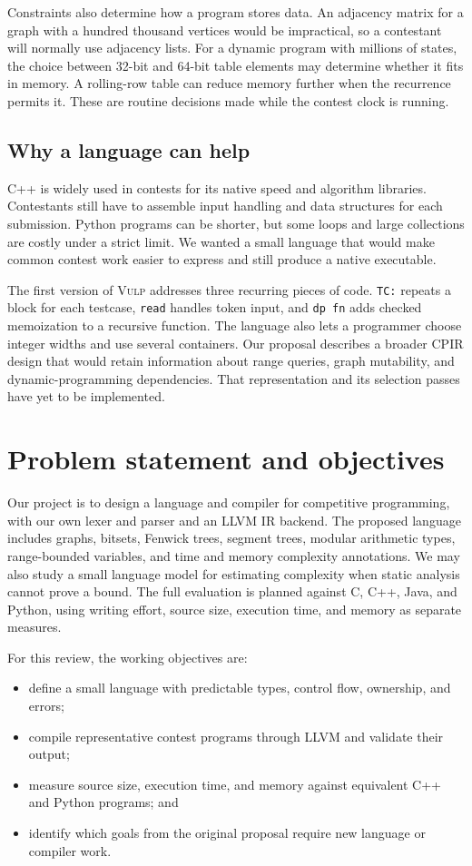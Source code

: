 \documentclass[12pt,a4paper]{report}
\newcommand{\vulp}{\textsc{Vulp}}
\begin{document}
Constraints also determine how a program stores data. An adjacency matrix for a graph with a hundred thousand vertices would be impractical, so a contestant will normally use adjacency lists. For a dynamic program with millions of states, the choice between 32-bit and 64-bit table elements may determine whether it fits in memory. A rolling-row table can reduce memory further when the recurrence permits it. These are routine decisions made while the contest clock is running.

\subsection{Why a language can help}
C++ is widely used in contests for its native speed and algorithm libraries. Contestants still have to assemble input handling and data structures for each submission. Python programs can be shorter, but some loops and large collections are costly under a strict limit. We wanted a small language that would make common contest work easier to express and still produce a native executable.

The first version of \vulp{} addresses three recurring pieces of code. \texttt{TC:} repeats a block for each testcase, \texttt{read} handles token input, and \texttt{dp fn} adds checked memoization to a recursive function. The language also lets a programmer choose integer widths and use several containers. Our proposal describes a broader CPIR design that would retain information about range queries, graph mutability, and dynamic-programming dependencies. That representation and its selection passes have yet to be implemented.

\section{Problem statement and objectives}
Our project is to design a language and compiler for competitive programming, with our own lexer and parser and an LLVM IR backend. The proposed language includes graphs, bitsets, Fenwick trees, segment trees, modular arithmetic types, range-bounded variables, and time and memory complexity annotations. We may also study a small language model for estimating complexity when static analysis cannot prove a bound. The full evaluation is planned against C, C++, Java, and Python, using writing effort, source size, execution time, and memory as separate measures.

For this review, the working objectives are:
\begin{itemize}
\item define a small language with predictable types, control flow, ownership, and errors;
\item compile representative contest programs through LLVM and validate their output;
\item measure source size, execution time, and memory against equivalent C++ and Python programs; and
\item identify which goals from the original proposal require new language or compiler work.
\end{itemize}
\end{document}
